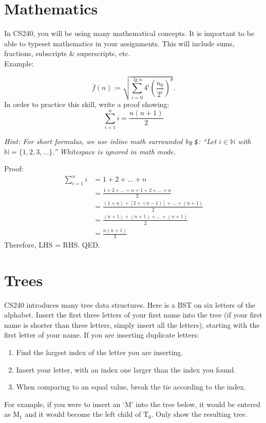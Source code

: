 \documentclass[12pt]{article}
\begin{document}
	\section{Mathematics}
	In CS240, you will be using many mathematical concepts. It is important to be able to typeset mathematics in your assignments. This will include sums, fractions, subscripts \& superscripts, etc. \\
	Example: 
	
	\[ \bar{f}(n) \coloneqq \sqrt {\sum_{i=0}^{\lg n} 4^i \left ( \frac{n_0}{2^i} \right )^{\theta}}. \]
	In order to practice this skill, write a proof showing: \[ \sum_{i=1}^n i = \frac {n(n+1)} {2} \]
	
	{\itshape
		Hint: For short formulas, we use inline math surrounded by \texttt{\$}: 
		``Let $i\in\mathbb{N}$ with $ \mathbb{N} = \{1,2,3,\ldots\} $.''
		Whitespace is ignored in math mode.
	}

	Proof:\\
	\begin{align*}
		\sum_{i=1}^n i &=1+2+\ldots+n\\
		&=\frac {1+2+\ldots+n+1+2+\ldots+n} {2}\\
		&=\frac {(1+n)+[2+(n-1)]+\ldots+(n+1)} {2}\\
		&=\frac {(n+1)+(n+1)+\ldots+(n+1)} {2}\\
		&=\frac {n(n+1)} {2}
	\end{align*}
	Therefore, LHS = RHS.   QED.
	
	
	\section{Trees}
	
	CS240 introduces many tree data structures. Here is a BST on six letters of the 
	alphabet. Insert the first three letters of your first name into the tree (if your first 
	name is shorter than three letters, simply insert all the letters), starting 
	with the first letter of your name. If you are inserting duplicate
	letters:
	
	\begin{enumerate}[(1)]
		\item Find the largest index of the letter you are inserting. 
		\item Insert your letter, with an index one larger than the index you found.
		\item When comparing to an equal value, break the tie according to the index.
		
	\end{enumerate}
	For example, if you were to insert an `M' into the tree below, 
	it would be entered as $\mathrm{M}_1$ and it would become the left child of 
	$\mathrm{T}_0$. Only show the resulting tree.
	
\end{document}
